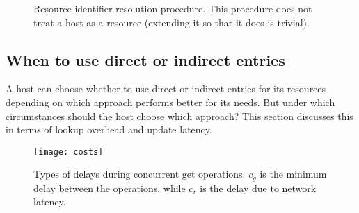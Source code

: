 \documentclass{article}
\begin{document}
\begin{figure}
  \centering
  \caption{Resource identifier resolution procedure.  This procedure
    does not treat a host as a resource (extending it so that it does
    is trivial).}
  \label{fig:resolution-procedure}
\end{figure}


\subsection{When to use direct or indirect entries}
\label{sec:threshold}

A host can choose whether to use direct or indirect entries for its
resources depending on which approach performs better for its needs.
But under which circumstances should the host choose which approach?
This section discusses this in terms of lookup overhead and update
latency.

\begin{figure}
  \centering
  \texttt{[image: costs]}
  \caption{Types of delays during concurrent get operations.  $c_g$ is
    the minimum delay between the operations, while $c_r$ is the delay
    due to network latency.}
  \label{fig:cost-types}
\end{figure}
\end{document}
